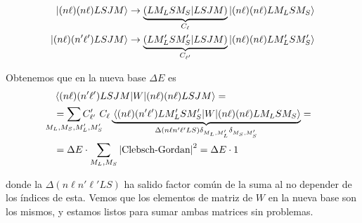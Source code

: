 \begin{equation}
  \begin{split}
    \ket{(n\ell)(n\ell)LSJM} &\rightarrow  \underbrace{(LM_LSM_S|LSJM)}_{C_\ell}\ket{(n\ell)(n\ell)LM_LSM_S}\\
    \ket{(n\ell)(n'\ell')LSJM} &\rightarrow
    \underbrace{(LM_L'SM_S'|LSJM)}_{C_{\ell'}}\ket{(n\ell)(n\ell)LM_L'SM_S'}
  \end{split}
\end{equation}

Obtenemos que en la nueva base $\Delta E$ es
\begin{equation}
  \begin{split}
    &\mel{(n\ell)(n'\ell')LSJM}{W}{(n\ell)(n\ell)LSJM} = \\
    &= \sum_{\mathclap{M_L,M_S,M_L',M_S'}}
    C'_{\ell'}\ C_{\ell} \underbrace{\mel{(n\ell)(n'\ell')LM_L'SM_S'}{W}{(n\ell)
        (n\ell)LM_LSM_S}}_{\Delta(n\ell n'\ell'LS)\delta_{M_L,M_L'}\delta_{M_S,M_S'}}= \\
    &= \Delta E \cdot \sum_{M_L,M_S}
    \abs{\text{Clebsch-Gordan}}^2 = \Delta E \cdot 1\\
  \end{split}
\end{equation}

donde la $\Delta(n\ell n'\ell' L S)$ ha salido factor común de la suma al no
depender de los índices de esta. Vemos que los elementos de matriz de
$W$ en la nueva base son los mismos, y estamos listos para sumar ambas
matrices sin problemas.

